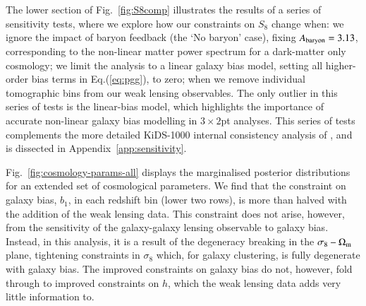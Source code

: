 The lower section of Fig.~\ref{fig:S8comp} illustrates the results of a series of sensitivity tests, where we explore how our constraints on $S_8$ change when: we ignore the impact of baryon feedback (the `No baryon' case), fixing $A_{\rm baryon}=3.13$, corresponding to the non-linear matter power spectrum for a dark-matter only cosmology; we limit the analysis to a linear galaxy bias model, setting all higher-order bias terms in Eq.(\ref{eq:pgg}), to zero; when we remove individual tomographic bins from our weak lensing observables.    The only outlier in this series of tests is the linear-bias model, which highlights the importance of accurate non-linear galaxy bias modelling in $3\times2$pt analyses.    This series of tests complements the more detailed KiDS-1000 internal consistency analysis of \citet{asgari/etal:inprep}, and is dissected in Appendix~\ref{app:sensitivity}.

Fig.~\ref{fig:cosmology-params-all} displays the marginalised posterior distributions for an extended set of cosmological parameters.   We find that the constraint on galaxy bias,  $b_1$, in each redshift bin (lower two rows), is more than halved with the addition of the weak lensing data.   This constraint does not arise, however, from the sensitivity of the galaxy-galaxy lensing observable to galaxy bias.  Instead, in this analysis, it is a result of the degeneracy breaking in the $\sigma_8-\Omega_{\rm m}$ plane, tightening constraints in $\sigma_8$ which, for galaxy clustering, is fully degenerate with galaxy bias.  The improved constraints on galaxy bias do not, however, fold through to improved constraints on $h$, which the weak lensing data adds very little information to.

